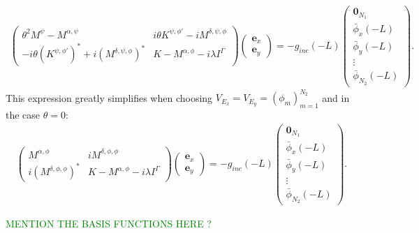 \begin{align*}
\left(\begin{matrix}
\theta^2 M^{\psi}-M^{\alpha,\psi} & i\theta K^{\psi,\phi'}-i M^{\delta,\psi,\phi} \\
-i\theta (K^{\psi,\phi'})^{*}+i (M^{\delta,\psi,\phi})^{*} & K-M^{\alpha,\phi}-i\lambda I^{\Gamma}
\end{matrix}\right)
\left(
\begin{matrix}
\boldsymbol{e}_x\\
\boldsymbol{e}_y
\end{matrix}
\right)=-g_{inc}(-L)
\left(
\begin{matrix}
\boldsymbol{0}_{N_{1}}\\
\bar{\phi}_{x}(-L)\\
\bar{\phi}_{y}(-L)\\
\vdots\\
\bar{\phi}_{N_{2}}(-L)
\end{matrix}
\right).
\end{align*}
This expression greatly simplifies when choosing $V_{E_x}=V_{E_{y}}=\left(\phi_{m}\right)_{m=1}^{N_{2}}$ and in the case $\theta=0$:
\begin{align}
\label{eq:simple_system}
\left(\begin{matrix}
M^{\alpha,\phi} & i M^{\delta,\phi,\phi} \\
i (M^{\delta,\phi,\phi})^{*} & K-M^{\alpha,\phi}-i\lambda I^{\Gamma}
\end{matrix}\right)
\left(
\begin{matrix}
\boldsymbol{e}_x\\ 
\boldsymbol{e}_y
\end{matrix}
\right)=-g_{inc}(-L)
\left(
\begin{matrix}
\boldsymbol{0}_{N_{1}}\\
\bar{\phi}_{x}(-L)\\
\bar{\phi}_{y}(-L)\\
\vdots\\
\bar{\phi}_{N_{2}}(-L)
\end{matrix}
\right).
\end{align}

\textcolor{green}{MENTION THE BASIS FUNCTIONS HERE ?}
